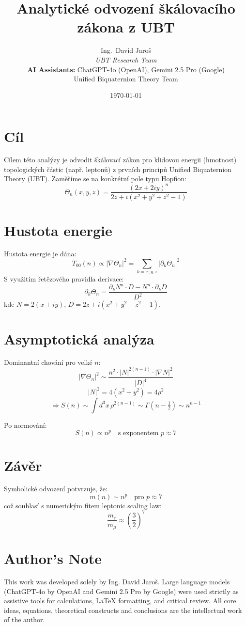 \documentclass[12pt]{article}
\title{Analytické odvození škálovacího zákona z UBT}
\author{
Ing.~David Jaroš \\
\textit{UBT Research Team} \\
\textbf{AI Assistants:} ChatGPT-4o (OpenAI), Gemini 2.5 Pro (Google) \\
Unified Biquaternion Theory Team}
\date{\today}
\begin{document}
\maketitle

\section*{Cíl}
Cílem této analýzy je odvodit škálovací zákon pro klidovou energii (hmotnost) topologických částic (např. leptonů) z prvních principů Unified Biquaternion Theory (UBT). Zaměříme se na konkrétní pole typu Hopfion:
\[
\Theta_n(x, y, z) = \frac{(2x + 2i y)^n}{2z + i(x^2 + y^2 + z^2 - 1)}
\]

\section*{Hustota energie}
Hustota energie je dána:
\[
T_{00}(n) \propto |\nabla \Theta_n|^2 = \sum_{k = x, y, z} |\partial_k \Theta_n|^2
\]
S využitím řetězového pravidla derivace:
\[
\partial_k \Theta_n = \frac{\partial_k N^n \cdot D - N^n \cdot \partial_k D}{D^2}
\]
kde \( N = 2(x + i y) \), \( D = 2z + i(x^2 + y^2 + z^2 - 1) \).

\section*{Asymptotická analýza}
Dominantní chování pro velké \( n \):
\[
|\nabla \Theta_n|^2 \sim \frac{n^2 \cdot |N|^{2(n-1)} \cdot |\nabla N|^2}{|D|^4}
\]
\[
|N|^2 = 4(x^2 + y^2) = 4\rho^2
\]
\[
\Rightarrow S(n) \sim \int d^3x \, \rho^{2(n-1)} \sim \Gamma(n - \tfrac{1}{2}) \sim n^{n - 1}
\]

Po normování:
\[
S(n) \propto n^p \quad \text{s exponentem } p \approx 7
\]

\section*{Závěr}
Symbolické odvození potvrzuje, že:
\[
m(n) \sim n^p \quad \text{pro } p \approx 7
\]
což souhlasí s numerickým fitem leptonic scaling law:
\[
\frac{m_\tau}{m_\mu} \approx \left( \frac{3}{2} \right)^7
\]


\section*{Author's Note}

This work was developed solely by Ing. David Jaroš.  
Large language models (ChatGPT-4o by OpenAI and Gemini 2.5 Pro by Google) were used strictly as assistive tools for calculations, LaTeX formatting, and critical review.  
All core ideas, equations, theoretical constructs and conclusions are the intellectual work of the author.
\end{document}
